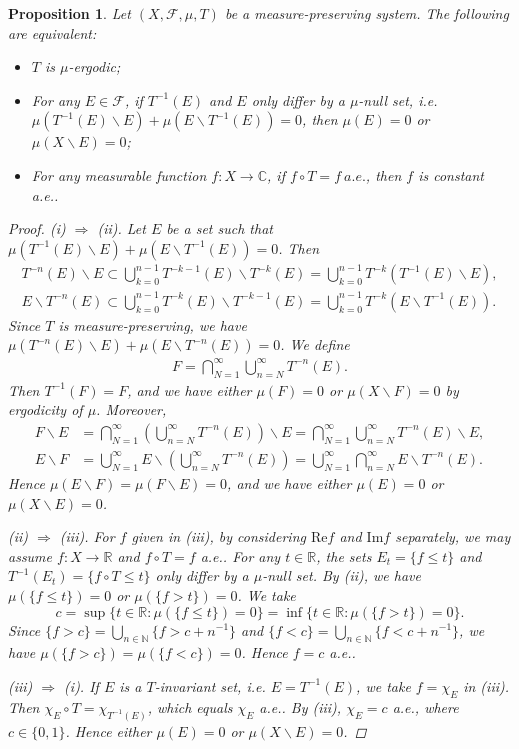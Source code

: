 \documentclass{article}
\numberwithin{equation}{section}
\newcommand{\bbC}{\mathbb{C}}
\newcommand{\bbN}{\mathbb{N}}
\newcommand{\bbR}{\mathbb{R}}
\newcommand{\scr}{\mathscr}
\renewcommand{\Re}{\mathrm{Re}}
\renewcommand{\Im}{\mathrm{Im}}
\theoremstyle{plain}
\newtheorem{proposition}[theorem]{Proposition}
\theoremstyle{definition}
\begin{document}
\begin{proposition}\label{ergodicfunc}
Let $(X,\scr{F},\mu,T)$ be a measure-preserving system. The following are equivalent:
\begin{itemize}
	\item[(i)] $T$ is $\mu$-ergodic;
	\item[(ii)] For any $E\in\scr{F}$, if $T^{-1}(E)$ and $E$ only differ by a $\mu$-null set, i.e. $\mu(T^{-1}(E)\backslash E)+\mu(E\backslash T^{-1}(E))=0$, then $\mu(E)=0$ or $\mu(X\backslash E)=0$;
	\item[(iii)] For any measurable function $f:X\to\bbC$, if $f\circ T=f\ a.e.$, then $f$ is constant a.e..
\end{itemize}
\begin{proof}
(i) $\Rightarrow$ (ii). Let $E$ be a set such that $\mu(T^{-1}(E)\backslash E)+\mu(E\backslash T^{-1}(E))=0$. Then
\begin{align*}
	T^{-n}(E)\backslash E\subset\bigcup_{k=0}^{n-1} T^{-k-1}(E)\backslash T^{-k}(E)=\bigcup_{k=0}^{n-1} T^{-k}(T^{-1}(E)\backslash E),\\ 
	E\backslash T^{-n}(E)\subset\bigcup_{k=0}^{n-1} T^{-k}(E)\backslash T^{-k-1}(E)=\bigcup_{k=0}^{n-1} T^{-k}(E\backslash T^{-1}(E)).
\end{align*}
Since $T$ is measure-preserving, we have $\mu(T^{-n}(E)\backslash E)+\mu(E\backslash T^{-n}(E))=0$. We define
\begin{align*}
	F=\bigcap_{N=1}^\infty\bigcup_{n=N}^\infty T^{-n}(E).
\end{align*}
Then $T^{-1}(F)=F$, and we have either $\mu(F)=0$ or $\mu(X\backslash F)=0$ by ergodicity of $\mu$. Moreover,
\begin{align*}
	F\backslash E&=\bigcap_{N=1}^\infty\left(\bigcup_{n=N}^\infty T^{-n}(E)\right)\backslash E=\bigcap_{N=1}^\infty\bigcup_{n=N}^\infty T^{-n}(E)\backslash E,\\
	E\backslash F&=\bigcup_{N=1}^\infty E\backslash\left(\bigcup_{n=N}^\infty T^{-n}(E)\right)=\bigcup_{N=1}^\infty\bigcap_{n=N}^\infty E\backslash T^{-n}(E).
\end{align*}
Hence $\mu(E\backslash F)=\mu(F\backslash E)=0$, and we have either $\mu(E)=0$ or $\mu(X\backslash E)=0$.

\item (ii) $\Rightarrow$ (iii). For $f$ given in (iii), by considering $\Re f$ and $\Im f$ separately, we may assume $f:X\to\bbR$ and $f\circ T=f$ a.e.. For any $t\in\bbR$, the sets $E_t=\{f\leq t\}$ and $T^{-1}(E_t)=\{f\circ T\leq t\}$ only differ by a $\mu$-null set. By (ii), we have $\mu(\{f\leq t\})=0$ or $\mu(\{f>t\})=0$. We take $$c=\sup\{t\in\bbR:\mu(\{f\leq t\})=0\}=\inf\{t\in\bbR:\mu(\{f>t\})=0\}.$$
Since $\{f>c\}=\bigcup_{n\in\bbN}\{f>c+n^{-1}\}$ and $\{f<c\}=\bigcup_{n\in\bbN}\{f<c+n^{-1}\}$, we have $\mu(\{f>c\})=\mu(\{f<c\})=0$. Hence $f=c$ a.e..

\item (iii) $\Rightarrow$ (i). If $E$ is a $T$-invariant set, i.e. $E=T^{-1}(E)$, we take $f=\chi_E$ in (iii). Then $\chi_E\circ T=\chi_{T^{-1}(E)}$, which equals $\chi_E$ a.e.. By (iii), $\chi_E=c$ a.e., where $c\in\{0,1\}$. Hence either $\mu(E)=0$ or $\mu(X\backslash E)=0$.
\end{proof}
\end{proposition}
\end{document}
